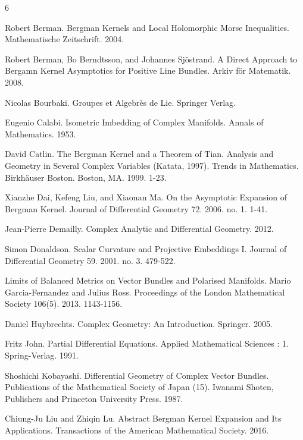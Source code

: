 \documentclass{amsart}
\theoremstyle{definition}
\theoremstyle{remark}
\numberwithin{equation}{section}
\begin{document}
\newpage


\begin{thebibliography}{6}



Robert Berman.
Bergman Kernels and Local Holomorphic Morse Inequalities.
Mathematische Zeitschrift. 2004.



Robert Berman, Bo Berndtsson, and Johannes Sj\"ostrand.
A Direct Approach to Bergamn Kernel Asymptotics for Positive Line Bundles.
Arkiv f\"or Matematik. 2008.





Nicolas Bourbaki.
Groupes et Algebr\`es de Lie.
Springer Verlag.


Eugenio Calabi.
Isometric Imbedding of Complex Manifolds.
Annals of Mathematics. 1953.

David Catlin.
The Bergman Kernel and a Theorem of Tian.
Analysis and Geometry in Several Complex Variables (Katata, 1997).
Trends in Mathematics. 
Birkh\"auser Boston. 
Boston, MA. 
1999. 
1-23.

Xianzhe Dai, Kefeng Liu, and Xiaonan Ma.
On the Asymptotic Expansion of Bergman Kernel.
Journal of Differential Geometry 72. 2006.
no. 1.
1-41.



Jean-Pierre Demailly.
Complex Analytic and Differential Geometry.
2012.


Simon Donaldson.
Scalar Curvature and Projective Embeddings I.
Journal of Differential Geometry 59. 2001.
no. 3.
479-522.


Limits of Balanced Metrics on Vector Bundles and Polarised Manifolds.
Mario Garcia-Fernandez and Julius Ross.
Proceedings of the London Mathematical Society 106(5). 2013.
1143-1156.


Daniel Huybrechts.
Complex Geometry: An Introduction.
Springer.
2005.

Fritz John.
Partial Differential Equations.
Applied Mathematical Sciences : 1.
Spring-Verlag.
1991.

Shoshichi Kobayashi.
Differential Geometry of Complex Vector Bundles.
Publications of the Mathematical Society of Japan (15). 
Iwanami Shoten, Publishers and Princeton University Press.
1987.



Chiung-Ju Liu and Zhiqin Lu.
Abstract Bergman Kernel Expansion and Its Applications.
Transactions of the American Mathematical Society. 
2016.



\end{thebibliography}
\end{document}
